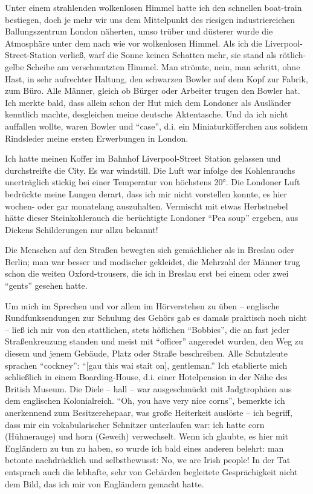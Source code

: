 \documentclass[a5paper,pagesize,10pt,twoside=true]{scrbook}
\begin{document}
Unter einem strahlenden wolkenlosen Himmel hatte ich den schnellen boat-train bestiegen, doch je mehr wir uns dem Mittelpunkt des riesigen industriereichen Ballungszentrum London näherten, umso trüber und düsterer wurde die Atmosphäre unter dem nach wie vor wolkenlosen Himmel. Als ich die Liverpool-Street-Station verließ, warf die Sonne keinen Schatten mehr, sie stand als rötlich-gelbe Scheibe am verschmutzten Himmel. Man strömte, nein, man schritt, ohne Hast, in sehr aufrechter Haltung, den schwarzen Bowler auf dem Kopf zur Fabrik, zum Büro. Alle Männer, gleich ob Bürger oder Arbeiter trugen den Bowler hat. Ich merkte bald, dass allein schon der Hut mich dem Londoner als Ausländer kenntlich machte, desgleichen meine deutsche Aktentasche. Und da ich nicht auffallen wollte, waren Bowler und \enquote{case}, d.i. ein Miniaturköfferchen aus solidem Rindsleder meine ersten Erwerbungen in London.

Ich hatte meinen Koffer im Bahnhof Liverpool-Street Station gelassen und durchstreifte die City. Es war windstill. Die Luft war infolge des Kohlenrauchs unerträglich stickig bei einer Temperatur von höchstens 20°. Die Londoner Luft bedrückte meine Lungen derart, dass ich mir nicht vorstellen konnte, es hier wochen- oder gar monatelang auszuhalten. Vermischt mit etwas Herbstnebel hätte dieser Steinkohlerauch die berüchtigte Londoner \enquote{Pea soup} ergeben, aus Dickens Schilderungen nur allzu bekannt!

Die Menschen auf den Straßen bewegten sich gemächlicher als in Breslau oder Berlin; man war besser und modischer gekleidet, die Mehrzahl der Männer trug schon die weiten Oxford-trousers, die ich in Breslau erst bei einem oder zwei \enquote{gents} gesehen hatte.

Um mich im Sprechen und vor allem im Hörverstehen zu üben -- englische Rundfunksendungen zur Schulung des Gehörs gab es damals praktisch noch nicht -- ließ ich mir von den stattlichen, stets höflichen \enquote{Bobbies}, die an fast jeder Straßenkreuzung standen und meist mit \enquote{officer} angeredet wurden, den Weg zu diesem und jenem Gebäude, Platz oder Straße beschreiben. Alle Schutzleute sprachen \enquote{cockney}: \enquote{[gau this wai stait on], gentleman.} Ich etablierte mich schließlich in einem Boarding-House, d.i. einer Hotelpension in der Nähe des British Museum. Die Diele -- hall -- war ausgeschmückt mit Jadgtrophäen aus dem englischen Kolonialreich. \enquote{Oh, you have very nice corns}, bemerkte ich anerkennend zum Besitzerehepaar, was große Heiterkeit auslöste -- ich begriff, dass mir ein vokabularischer Schnitzer unterlaufen war: ich hatte corn (Hühnerauge) und horn (Geweih) verwechselt. Wenn ich glaubte, es hier mit Engländern zu tun zu haben, so wurde ich bald eines anderen belehrt: man betonte nachdrücklich und selbstbewusst: No, we are Irish people! In der Tat entsprach auch die lebhafte, sehr von Gebärden begleitete Gesprächigkeit nicht dem Bild, das ich mir von Engländern gemacht hatte.
\end{document}

